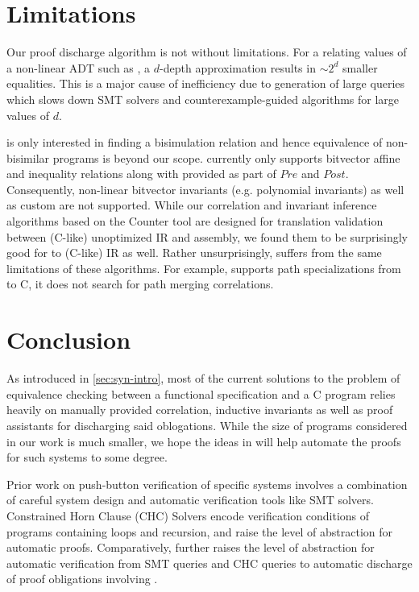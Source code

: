 \vspace{-12px}
\section{Limitations}
\vspace{-10px}
\label{sec:syn-limitations}
Our proof discharge algorithm is not without limitations.
For a \recursiveRelation{} relating values of a non-linear ADT such as , a $d$-depth
approximation results in $\sim 2^d$ smaller equalities. This is a major cause of inefficiency due to
generation of large queries which slows down SMT solvers and counterexample-guided algorithms for large values of $d$.

\toolName{} is only interested in finding a bisimulation relation and hence
equivalence of non-bisimilar programs is beyond our scope.
\toolName{} currently only supports bitvector affine and inequality relations
along with \recursiveRelations{} provided as part of $Pre$ and $Post$.
Consequently, non-linear bitvector invariants (e.g. polynomial invariants)
as well as custom \recursiveRelations{} are not supported.
While our correlation and invariant inference algorithms based on the Counter tool \cite{oopsla20}
are designed for translation validation between (C-like) unoptimized IR and assembly, we found them
to be surprisingly good for \SpecL{} to (C-like) IR as well. Rather unsurprisingly, \toolName{}
suffers from the same limitations of these algorithms. For example, \toolName{} supports path
specializations from \SpecL{} to C, it does not search for path merging correlations.
\vspace{-12px}
\section{Conclusion}
\vspace{-10px}
\label{sec:syn-conclusion}
As introduced in \cref{sec:syn-intro}, most of the current solutions
to the problem of equivalence checking between a functional specification
and a C program relies heavily on manually provided correlation, inductive
invariants as well as proof assistants for discharging said oblogations.
While the size of programs considered in our work is much smaller,
we hope the ideas in \toolName{} will help
automate the proofs for such systems to some degree.

Prior work on push-button verification of specific
systems \cite{fscq,hyperkernel,serval,verifiedBPF}
involves a combination of careful system design and
automatic verification tools like SMT solvers.
Constrained Horn Clause (CHC) Solvers \cite{CHCeq}
encode verification conditions of programs containing loops and recursion,
and raise the level of abstraction for automatic proofs.
Comparatively, \toolName{} further raises the level
of abstraction for automatic verification from
SMT queries and CHC queries to automatic discharge of
proof obligations involving \recursiveRelations{}.

